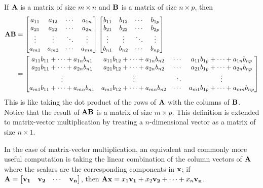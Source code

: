 \documentclass[../main.tex]{subfiles}
\begin{document}
\begin{definition}
	If $\mathbf{A}$ is a matrix of size $m\times n$ and $\mathbf{B}$ is a matrix of size $n\times p$, then
	\begin{align*}
		\mathbf{A}\mathbf{B} & =
		\begin{bmatrix}
			a_{11} & a_{12} & \cdots & a_{1n} \\
			a_{21} & a_{22} & \cdots & a_{2n} \\
			\vdots & \vdots & \ddots & \vdots \\
			a_{m1} & a_{m2} & \cdots & a_{mn}
		\end{bmatrix}
		\begin{bmatrix}
			b_{11} & b_{12} & \cdots & b_{1p} \\
			b_{21} & b_{22} & \cdots & b_{2p} \\
			\vdots & \vdots & \ddots & \vdots \\
			b_{n1} & b_{n2} & \cdots & b_{np}
		\end{bmatrix}                                                                                                      \\
		                 & =\begin{bmatrix}
			                    a_{11}b_{11}+\cdots +a_{1n}b_{n1} & a_{11}b_{12}+\cdots +a_{1n}b_{n2} & \cdots & a_{11}b_{1p}+\cdots +a_{1n}b_{np} \\
			                    a_{21}b_{11}+\cdots +a_{2n}b_{n1} & a_{21}b_{12}+\cdots +a_{2n}b_{n2} & \cdots & a_{21}b_{1p}+\cdots +a_{2n}b_{np} \\
			                    \vdots                            & \vdots                            & \ddots & \vdots                            \\
			                    a_{m1}b_{11}+\cdots +a_{mn}b_{n1} & a_{m1}b_{12}+\cdots +a_{mn}b_{n2} & \cdots & a_{m1}b_{1p}+\cdots +a_{mn}b_{np}
		                    \end{bmatrix}
	\end{align*}
	This is like taking the dot product of the rows of $\mathbf{A}$ with the
	columns of $\mathbf{B}$. Notice that the result of $\mathbf{A}\mathbf{B}$
	is a matrix of size $m\times p$. This definition is extended to matrix-vector
	multiplication by treating a $n$-dimensional vector as a matrix of size $n\times 1$.

	In the case of matrix-vector multiplication, an equivalent
	and commonly more useful computation is taking the linear combination of the
	column vectors of $\mathbf{A}$ where the scalars are the corresponding
	components in $\mathbf{x}$; if $\mathbf{A}=\begin{bmatrix}\mathbf{v_1}&\mathbf{v_2}&\cdots&\mathbf{v_n}\end{bmatrix}$,
	then $\mathbf{A}\mathbf{x}=x_1\mathbf{v_1}+x_2\mathbf{v_2}+\cdots +x_n\mathbf{v_n}$.
\end{definition}
\end{document}
